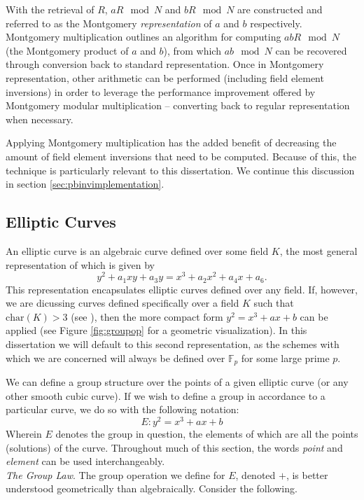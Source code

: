 With the retrieval of $R$, $aR \mod{N}$ and $bR \mod{N}$ are constructed and referred to as the Montgomery \emph{representation} of $a$ and $b$ respectively. Montgomery multiplication outlines an algorithm for computing $abR \mod{N}$ (the Montgomery product of $a$ and $b$), from which $ab \mod{N}$ can be recovered through conversion back to standard representation. Once in Montgomery representation, other arithmetic can be performed (including field element inversions) in order to leverage the performance improvement offered by Montgomery modular multiplication -- converting back to regular representation when necessary.

Applying Montgomery multiplication has the added benefit of decreasing the amount of field element inversions that need to be computed. Because of this, the technique is particularly relevant to this dissertation. We continue this discussion in section \ref{sec:pbinvimplementation}.

\subsection{Elliptic Curves}

An elliptic curve is an algebraic curve defined over some field $K$, the most general representation of which is given by
$$
y^2 + a_{1}xy + a_{3}y = x^3 + a_{2}x^2 + a_{4}x + a_6.
$$
This representation encapsulates elliptic curves defined over any field. If, however, we are dicussing curves defined specifically over a field $K$ such that $\text{char}(K) > 3$ (see \cite{silverman}), then the more compact form $y^2 = x^3 + ax + b$ can be applied (see Figure \ref{fig:groupop} for a geometric visualization). In this dissertation we will default to this second representation, as the schemes with which we are concerned will always be defined over $\mathbb{F}_p$ for some large prime $p$.

We can define a group structure over the points of a given elliptic curve (or any other smooth cubic curve). If we wish to define a group in accordance to a particular curve, we do so with the following notation:
$$
E: y^2 = x^3 + ax + b
$$
Wherein $E$ denotes the group in question, the elements of which are all the points (solutions) of the curve. Throughout much of this section, the words \emph{point} and \emph{element} can be used interchangeably.\\

\noindent
\emph{The Group Law}. The group operation we define for $E$, denoted $+$, is better understood geometrically than algebraically. Consider the following.

